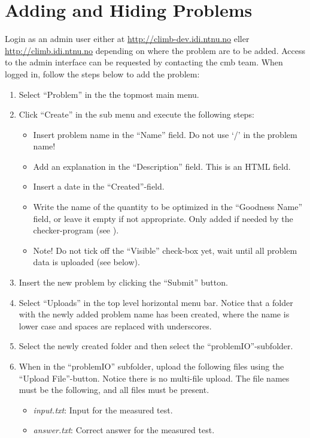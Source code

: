 \section{Adding and Hiding Problems}
Login as an admin user either at \url{http://climb-dev.idi.ntnu.no} eller \url{http://climb.idi.ntnu.no} depending on where the problem are to be added. Access to the admin interface can be requested by contacting the \gls{cmb} team. When logged in, follow the steps below to add the problem:
\begin{enumerate}
  \item Select ``Problem'' in the the topmost main menu.
  \item Click ``Create'' in the sub menu and execute the following steps:
  \begin{itemize}
    \item Insert problem name in the ``Name'' field. Do not use ‘/’ in the problem name!
    \item Add an explanation in the ``Description'' field. This is an HTML field.
    \item Insert a date in the ``Created''-field.
    \item Write the name of the quantity to be optimized in the ``Goodness Name'' field, or leave it empty if not appropriate. Only added if needed by the checker-program (see ).
    \item Note! Do not tick off the ``Visible'' check-box yet, wait until all problem data is uploaded (see below).
  \end{itemize}
  \item Insert the new problem by clicking the ``Submit'' button.
  \item Select ``Uploads'' in the top level horizontal menu bar. Notice that a folder with the newly added problem name has been created, where the name is lower case and spaces are replaced with underscores.
  \item Select the newly created folder and then select the ``problemIO''-subfolder.
  \item When in the ``problemIO'' subfolder, upload the following files using the ``Upload File''-button. Notice there is no multi-file upload. The file names must be the following, and all files must be present.
  \begin{itemize}
    \item \textit{input.txt}: Input for the measured test.
    \item \textit{answer.txt}: Correct answer for the measured test.

\end{itemize}
\end{enumerate}
